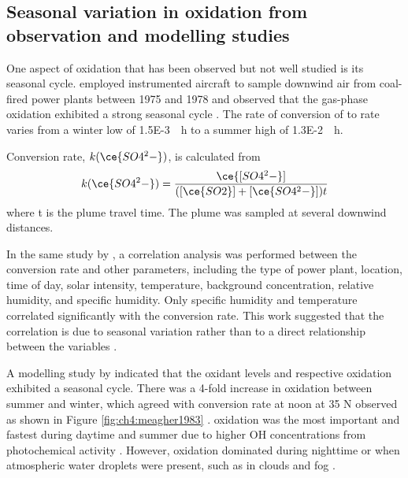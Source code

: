 \subsection{Seasonal variation in \textsoo{}  oxidation from observation and modelling studies}
\label{ch4:seasonal-so2-oxidation-observation}

One aspect of  oxidation that has been observed but not well studied is its seasonal cycle. \citet{meagherSeasonalVariationAtmospheric1983} employed instrumented aircraft to sample downwind air from coal-fired power plants between 1975 and 1978 and observed that the gas-phase  oxidation exhibited a strong seasonal cycle \citep{meagherSeasonalVariationAtmospheric1983}. The rate of conversion of  to  rate varies from a winter low of \qty{1.5E-3}{\per\hour} to a summer high of \qty{1.3E-2}{\per\hour}. 


Conversion rate, $k(\ce{SO4^2-})$, is calculated from
\begin{equation}
k(\ce{SO4^2-}) = \frac{\ce{[SO4^2-}]}{([\ce{SO2}]+[\ce{SO4^2-}])t}
\end{equation}
where t is the plume travel time. The plume was sampled at several downwind distances.


In the same study by \citet{meagherSeasonalVariationAtmospheric1983}, a correlation analysis was performed between the conversion rate and other parameters, including the type of power plant, location, time of day, solar intensity, temperature, background  concentration, relative humidity, and specific humidity. Only specific humidity and temperature correlated significantly with the conversion rate. This work suggested that the correlation is due to seasonal variation rather than to a direct relationship between the variables \citep{meagherSeasonalVariationAtmospheric1983}.


A modelling study by \citet{feichterSimulationTroposphericSulfur1996} indicated that the oxidant levels and respective oxidation exhibited a seasonal cycle. There was a 4-fold increase in  oxidation between summer and winter, which agreed with  conversion rate at noon at 35 \textdegree N observed as shown in Figure \ref{fig:ch4:meagher1983} \citep{meagherSeasonalVariationAtmospheric1983}.  oxidation was the most important and fastest during daytime and summer due to higher OH concentrations from photochemical activity \citep{eatoughConversionSO2Sulfate1994}. However,  oxidation dominated during nighttime or when atmospheric water droplets were present, such as in clouds and fog \cite[e.g. ][]{heggMeasurementsSulfateProduction1982, gillaniGasparticleConversionSulfur1983, husainStudyHeterogeneousOxidation1991, eatoughConversionSO2Sulfate1994}. 


